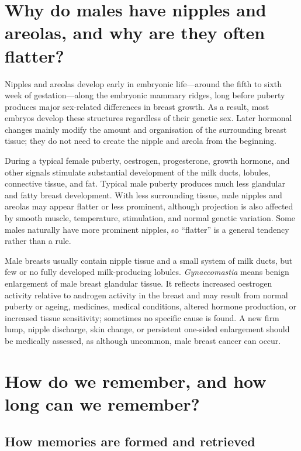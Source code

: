 \documentclass[11pt,oneside]{report}
\begin{document}
\section{Why do males have nipples and areolas, and why are they often flatter?}

Nipples and areolas develop early in embryonic life—around the fifth to sixth
week of gestation—along the embryonic mammary ridges, long before puberty
produces major sex-related differences in breast growth. As a result,
most embryos develop these structures regardless of their genetic sex. Later
hormonal changes mainly modify the amount and organisation of the surrounding
breast tissue; they do not need to create the nipple and areola from the
beginning.

During a typical female puberty, oestrogen, progesterone, growth hormone, and
other signals stimulate substantial development of the milk ducts, lobules,
connective tissue, and fat. Typical male puberty produces much less glandular
and fatty breast development. With less surrounding tissue, male nipples and
areolas may appear flatter or less prominent, although projection is also
affected by smooth muscle, temperature, stimulation, and normal genetic
variation. Some males naturally have more prominent nipples, so ``flatter'' is a
general tendency rather than a rule.

Male breasts usually contain nipple tissue and a small system of milk ducts, but
few or no fully developed milk-producing lobules. \emph{Gynaecomastia} means
benign enlargement of male breast glandular tissue. It reflects increased
oestrogen activity relative to androgen activity in the breast and may result
from normal puberty or ageing, medicines, medical conditions, altered hormone
production, or increased tissue sensitivity; sometimes no specific cause is
found. A new firm lump, nipple discharge, skin change, or persistent one-sided
enlargement should be medically assessed, as although uncommon, male breast
cancer can occur.

\section{How do we remember, and how long can we remember?}

\subsection*{How memories are formed and retrieved}
\end{document}
